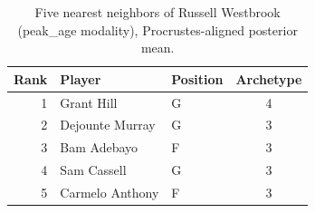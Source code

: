 \begin{table}[htbp]
  \centering\small
  \begin{tabular}{rllc}
    \toprule
    Rank & Player & Position & Archetype \\
    \midrule
    1 & Grant Hill & G & 4 \\
    2 & Dejounte Murray & G & 3 \\
    3 & Bam Adebayo & F & 3 \\
    4 & Sam Cassell & G & 3 \\
    5 & Carmelo Anthony & F & 3 \\
    \bottomrule
  \end{tabular}
  \caption{Five nearest neighbors of Russell Westbrook (peak_age modality), Procrustes-aligned posterior mean.}
  \label{tab:Russell_Westbrook_neighbors_peak_age}
\end{table}

